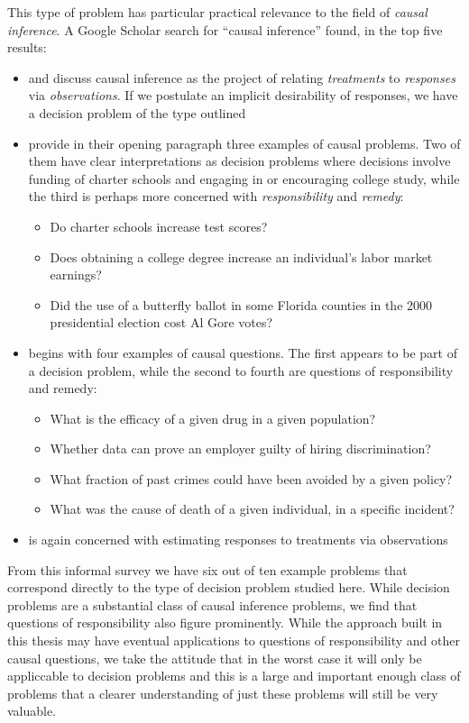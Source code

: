 This type of problem has particular practical relevance to the field of \emph{causal inference}. A Google Scholar search for ``causal inference'' found, in the top five results: 
\begin{itemize}
	\item \citet{holland_statistics_1986} and \citet{frangakis_principal_2002} discuss causal inference as the project of relating \emph{treatments} to \emph{responses} via \emph{observations}. If we postulate an implicit desirability of responses, we have a decision problem of the type outlined
	\item \citet{morgan_counterfactuals_2014} provide in their opening paragraph three examples of causal problems. Two of them have clear interpretations as decision problems where decisions involve funding of charter schools and engaging in or encouraging college study, while the third is perhaps more concerned with \emph{responsibility} and \emph{remedy}:
	\begin{itemize}
		\item Do charter schools increase test scores?
		\item Does obtaining a college degree increase an individual's labor market earnings?
		\item Did the use of a butterfly ballot in some Florida counties in the 2000 presidential election cost Al Gore votes?
	\end{itemize}
	\item \citet{pearl_causal_2009} begins with four examples of causal questions. The first appears to be part of a decision problem, while the second to fourth are questions of responsibility and remedy:
	\begin{itemize}
		\item What is the efficacy of a given drug in a given population? 
		\item Whether data can prove an employer guilty of hiring discrimination? 
		\item What fraction of past crimes could have been avoided by a given policy? 
		\item What was the cause of death of a given individual, in a specific incident?
	\end{itemize}
	\item \citet{robins_marginal_2000} is again concerned with estimating responses to treatments via observations
\end{itemize} 
From this informal survey we have six out of ten example problems that correspond directly to the type of decision problem studied here. While decision problems are a substantial class of causal inference problems, we find that questions of responsibility also figure prominently. While the approach built in this thesis may have eventual applications to questions of responsibility and other causal questions, we take the attitude that in the worst case it will only be appliccable to decision problems and this is a large and important enough class of problems that a clearer understanding of just these problems will still be very valuable.

